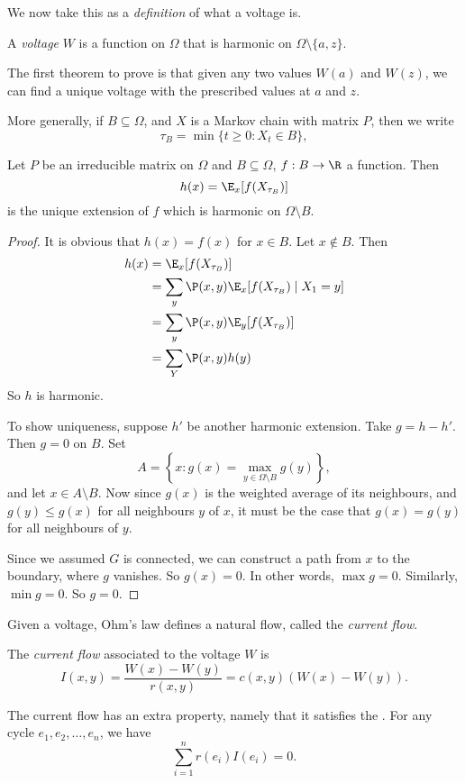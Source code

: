 \documentclass[a4paper]{article}
\begin{document}
We now take this as a \emph{definition} of what a voltage is.
\begin{defi}[Voltage]
  A \emph{voltage} $W$ is a function on $\Omega$ that is harmonic on $\Omega \setminus \{a, z\}$.
\end{defi}

The first theorem to prove is that given any two values $W(a)$ and $W(z)$, we can find a unique voltage with the prescribed values at $a$ and $z$.

More generally, if $B \subseteq \Omega$, and $X$ is a Markov chain with matrix $P$, then we write
\[
  \tau_B = \min\{t \geq 0: X_t \in B\},
\]

\begin{prop}
  Let $P$ be an irreducible matrix on $\Omega$ and $B \subseteq \Omega$, $f: B \to \R$ a function. Then
  \[
    h(x) = \E_x [f(X_{\tau_B})]
  \]
  is the unique extension of $f$ which is harmonic on $\Omega \setminus B$.
\end{prop}

\begin{proof}
  It is obvious that $h(x) = f(x)$ for $x \in B$. Let $x \not\in B$. Then
  \begin{align*}
    h(x) &= \E_x [f(X_{\tau_B})] \\
    &= \sum_y \P(x, y) \E_x[f(X_{\tau_B}) \mid X_1 = y]\\
    &= \sum_y \P(x, y) \E_y[f(X_{\tau_B})]\\
    &= \sum_Y \P(x, y) h(y)
  \end{align*}
  So $h$ is harmonic.

  To show uniqueness, suppose $h'$ be another harmonic extension. Take $g = h - h'$. Then $g = 0$ on $B$. Set
  \[
    A = \left\{x: g(x) = \max_{y \in \Omega \setminus B} g(y) \right\},
  \]
  and let $x \in A \setminus B$. Now since $g(x)$ is the weighted average of its neighbours, and $g(y) \leq g(x)$ for all neighbours $y$ of $x$, it must be the case that $g(x) = g(y)$ for all neighbours of $y$.

  Since we assumed $G$ is connected, we can construct a path from $x$ to the boundary, where $g$ vanishes. So $g(x) = 0$. In other words, $\max g = 0$. Similarly, $\min g = 0$. So $g = 0$.
\end{proof}

Given a voltage, Ohm's law defines a natural flow, called the \emph{current flow}.
\begin{defi}
  The \emph{current flow} associated to the voltage $W$ is
  \[
    I(x, y) = \frac{W(x) - W(y)}{r(x, y)} = c(x, y) (W(x) - W(y)).
  \]
\end{defi}
The current flow has an extra property, namely that it satisfies the . For any cycle $e_1, e_2, \ldots, e_n$, we have
\[
  \sum_{i = 1}^n r(e_i) I (e_i) = 0.
\]
\end{document}
